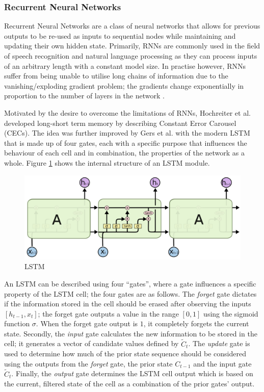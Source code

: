 \subsubsection{Recurrent Neural Networks}
Recurrent Neural Networks are a class of neural networks that allows for previous outputs to be re-used as inputs to sequential nodes while maintaining and updating their own hidden state. Primarily, RNNs are commonly used in the field of speech recognition and natural language processing as they can process inputs of an arbitrary length with a constant model size. In practise however, RNNs suffer from being unable to utilise long chains of information due to the vanishing/exploding gradient problem; the gradients change exponentially in proportion to the number of layers in the network \cite{Hochreiter:01book}.

Motivated by the desire to overcome the limitations of RNNs, Hochreiter et al. \cite{hochreiter1997long} developed long-short term memory by describing Constant Error Carousel (CECs). The idea was further improved by Gers et al. \cite{gers1999learning} with the modern LSTM that is made up of four gates, each with a specific purpose that influences the behaviour of each cell and in combination, the properties of the network as a whole. Figure \ref{fig:bg:lstm} shows the internal structure of an LSTM module.

\begin{figure}[ht]
  \centering
  \includegraphics[width=0.75\columnwidth]{sections/2background/images/lstm.png}
  \caption[Structure of an unrolled LSTM]{LSTM}
  \label{fig:bg:lstm}
\end{figure}

An LSTM can be described using four ``gates'', where a gate influences a specific property of the LSTM cell; the four gates are as follows. The \textit{forget} gate dictates if the information stored in the cell should be erased after observing the inputs $[h_{t-1}, x_t]$; the forget gate outputs a value in the range $[0, 1]$ using the sigmoid function $\sigma$. When the forget gate output is $1$, it completely forgets the current state. Secondly, the \textit{input} gate calculates the new information to be stored in the cell; it generates a vector of candidate values defined by $\tilde{C}_t$. The \textit{update} gate is used to determine how much of the prior state sequence should be considered using the outputs from the \textit{forget} gate, the prior state $C_{t-1}$ and the input gate $\tilde{C}_t$. Finally, the \textit{output} gate determines the LSTM cell output which is based on the current, filtered state of the cell as a combination of the prior gates' output.

